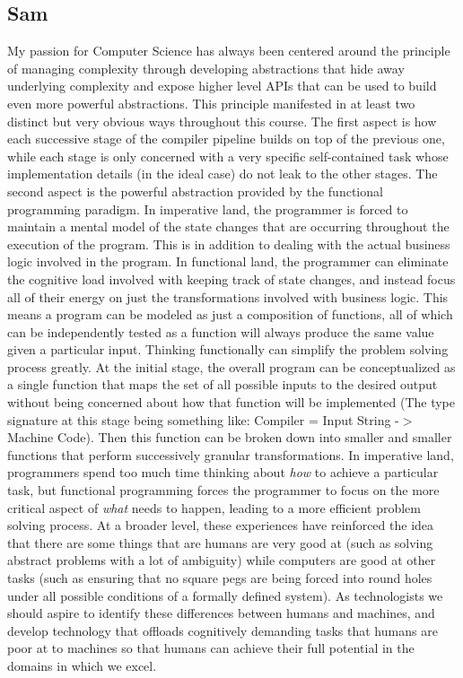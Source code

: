 \documentclass[12pt]{article}
\begin{document}
\subsection{Sam}
My passion for Computer Science has always been centered around the principle of managing complexity through developing abstractions that hide away underlying complexity and expose higher level APIs that can be used to build even more powerful abstractions. This principle manifested in at least two distinct but very obvious ways throughout this course. The first aspect is how each successive stage of the compiler pipeline builds on top of the previous one, while each stage is only concerned with a very specific self-contained task whose implementation details (in the ideal case) do not leak to the other stages. The second aspect is the powerful abstraction provided by the functional programming paradigm. In imperative land, the programmer is forced to maintain a mental model of the state changes that are occurring throughout the execution of the program. This is in addition to dealing with the actual business logic involved in the program. In functional land, the programmer can eliminate the cognitive load involved with keeping track of state changes, and instead focus all of their energy on just the transformations involved with business logic. This means a program can be modeled as just a composition of functions, all of which can be independently tested as a function will always produce the same value given a particular input. Thinking functionally can simplify the problem solving process greatly. At the initial stage, the overall program can be conceptualized as a single function that maps the set of all possible inputs to the desired output without being concerned about how that function will be implemented (The type signature at this stage being something like: Compiler = Input String -$>$ Machine Code). Then this function can be broken down into smaller and smaller functions that perform successively granular transformations. In imperative land, programmers spend too much time thinking about \textit{how} to achieve a particular task, but functional programming forces the programmer to focus on the more critical aspect of \textit{what} needs to happen, leading to a more efficient problem solving process. At a broader level, these experiences have reinforced the idea that there are some things that are humans are very good at (such as solving abstract problems with a lot of ambiguity) while computers are good at other tasks (such as ensuring that no square pegs are being forced into round holes under all possible conditions of a formally defined system). As technologists we should aspire to identify these differences between humans and machines, and develop technology that offloads cognitively demanding tasks that humans are poor at to machines so that humans can achieve their full potential in the domains in which we excel.
\end{document}
